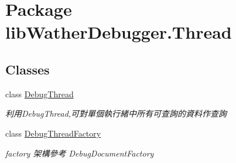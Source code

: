 \hypertarget{namespacelib_wather_debugger_1_1_thread}{\section{Package lib\+Wather\+Debugger.\+Thread}
\label{namespacelib_wather_debugger_1_1_thread}
}
\subsection*{Classes}
\begin{DoxyCompactItemize}
\item 
class \hyperlink{classlib_wather_debugger_1_1_thread_1_1_debug_thread}{Debug\+Thread}
\begin{DoxyCompactList}\small\item\em 利用\+Debug\+Thread,可對單個執行緒中所有可查詢的資料作查詢 \end{DoxyCompactList}\item 
class \hyperlink{classlib_wather_debugger_1_1_thread_1_1_debug_thread_factory}{Debug\+Thread\+Factory}
\begin{DoxyCompactList}\small\item\em factory 架構參考 Debug\+Document\+Factory \end{DoxyCompactList}\end{DoxyCompactItemize}
